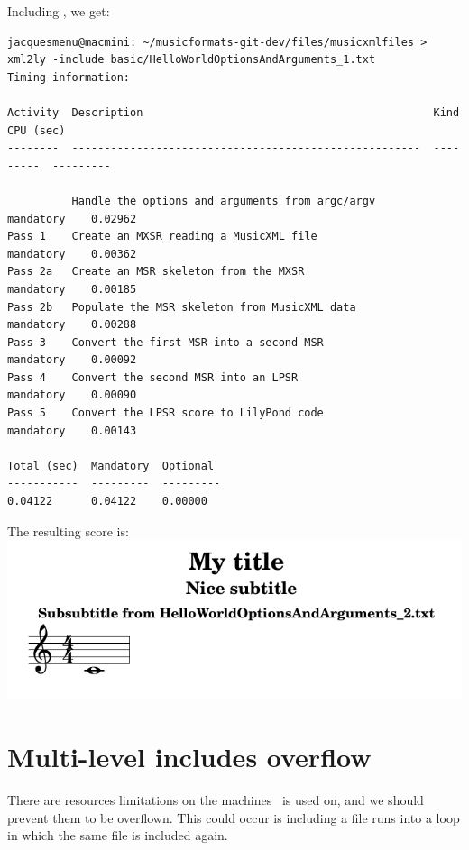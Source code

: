 Including , we get:
\begin{lstlisting}[language=Terminal]
jacquesmenu@macmini: ~/musicformats-git-dev/files/musicxmlfiles > xml2ly -include basic/HelloWorldOptionsAndArguments_1.txt
Timing information:

Activity  Description                                             Kind       CPU (sec)
--------  ------------------------------------------------------  ---------  ---------

          Handle the options and arguments from argc/argv         mandatory    0.02962
Pass 1    Create an MXSR reading a MusicXML file                  mandatory    0.00362
Pass 2a   Create an MSR skeleton from the MXSR                    mandatory    0.00185
Pass 2b   Populate the MSR skeleton from MusicXML data            mandatory    0.00288
Pass 3    Convert the first MSR into a second MSR                 mandatory    0.00092
Pass 4    Convert the second MSR into an LPSR                     mandatory    0.00090
Pass 5    Convert the LPSR score to LilyPond code                 mandatory    0.00143

Total (sec)  Mandatory  Optional
-----------  ---------  ---------
0.04122      0.04122    0.00000
\end{lstlisting}

The resulting score is:\\
\includegraphics[scale=0.7]{../graphics/HelloWorldWithMultiLevelInclude.png}


\section{Multi-level includes overflow}

There are resources limitations on the machines \mf\ is used on, and we should prevent them to be overflown. This could occur is including a file runs into a loop in which the same file is included again.

